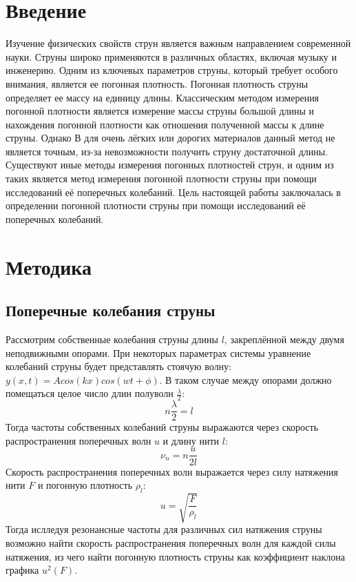 \documentclass[12pt]{article}
\begin{document}
\section{Введение}
Изучение физических свойств струн является важным направлением современной науки. Струны широко применяются в различных областях, 
включая музыку и инженерию. Одним из ключевых параметров струны, который требует особого внимания, является ее погонная плотность.
Погонная плотность струны определяет ее массу на единицу длины. Классическим методом измерения погонной плотности является измерение массы
струны большой длины и нахождения погонной плотности как отношения полученной массы к длине струны. Однако В для очень лёгких или дорогих материалов
данный метод не является точным, из-за невозможности получить струну достаточной длины. Существуют иные методы измерения погонных плотностей струн,
и одним из таких является метод измерения погонной плотности струны при помощи исследований её поперечных колебаний. Цель настоящей работы заключалась
в определении погонной плотности струны при помощи исследований её поперечных колебаний.

\section{Методика}
\subsection{Поперечные колебания струны}
Рассмотрим собственные колебания струны длины $l$, закреплённой между двумя неподвижными опорами. При некоторых параметрах системы уравнение колебаний струны
будет представлять стоячую волну: $y(x, t) = Acos(kx)cos(wt + \phi)$. В таком случае между опорами должно помещаться целое число длин полуволн 
$\frac{\lambda}{2}$:
\begin{equation}\label{eq:1}
    n\frac{\lambda}{2} = l
\end{equation}
Тогда частоты собственных колебаний струны выражаются через скорость распространения поперечных волн $u$ и длину нити $l$:
\begin{equation}\label{eq:2}
    \nu_n = n\frac{u}{2l}
\end{equation}
Скорость распространения поперечных волн выражается через силу натяжения нити $F$ и погонную плотность $\rho_l$:
\begin{equation}\label{eq:3}
    u = \sqrt{\frac{F}{\rho_l}}
\end{equation}
Тогда ислледуя резонансные частоты для различных сил натяжения струны возможно найти скорость распространения поперечных волн для каждой
силы натяжения, из чего найти погонную плотность струны как коэффициент наклона графика $u^2(F)$.
\end{document}
